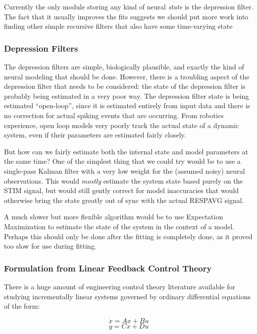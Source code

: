 \documentclass[11pt]{article}
\begin{document}
   Currently the only module storing any kind of neural \emph{state} is the depression filter. The fact that it usually improves the fits suggests we should put more work  into finding other simple recursive filters that also have some time-varying state

\subsubsection{Depression Filters}
\label{sec-2.4.1}


    The depression filters are simple, biologically plausible, and exactly the kind of neural modeling that should be done. However, there is a troubling aspect of the depression filter that needs to be considered: the state of the depression filter is probably being estimated in a very poor way. The depression filter state is being estimated ``open-loop'', since it is estimated entirely from input data and there is no correction for actual spiking events that are occurring. From robotics experience, open loop models very poorly track the actual state of a dynamic system, even if their parameters are estimated fairly closely.

    But how can we fairly estimate both the internal state and model parameters at the same time? One of the simplest thing that we could try would be to use a single-pass Kalman filter with a very low weight for the (assumed noisy) neural observations. This would \emph{mostly} estimate the system state based purely on the STIM signal, but would still gently correct for model inaccuracies that would otherwise bring the state greatly out of sync with the actual RESPAVG signal.

    A much slower but more flexible algorithm would be to use Expectation Maximization to estimate the state of the system in the context of a model. Perhaps this should only be done after the fitting is completely done, as it proved too slow for use during fitting.

\subsubsection{Formulation from Linear Feedback Control Theory}
\label{sec-2.4.2}


    There is a huge amount of engineering control theory literature available for studying incrementally linear systems governed by ordinary differential equations of the form:
    
    \[ \dot{x} = Ax + Bu \]
    \[ y = Cx + Du \]
\end{document}
